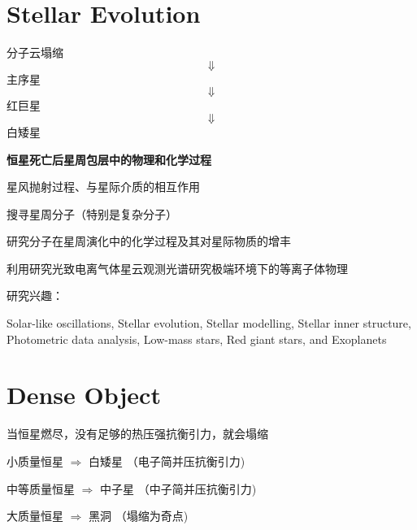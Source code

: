 \documentclass[CJK]{beamer}
\begin{document}
\section{Stellar Evolution}


\begin{frame}
  \bch
  \emini
  \bcenter
  分子云塌缩
  $$ \Downarrow$$
  主序星
  $$ \Downarrow$$
  红巨星
  $$ \Downarrow$$
  白矮星
  \ecenter
  \emini
  \ech
\end{frame}

\begin{frame}
  \bch

        {\bf 恒星死亡后星周包层中的物理和化学过程}
        
  
  \emini
                 
        \bitem
        \item{星风抛射过程、与星际介质的相互作用}
        \item{搜寻星周分子（特别是复杂分子）}
        \item{研究分子在星周演化中的化学过程及其对星际物质的增丰}
        \item{利用研究光致电离气体星云观测光谱研究极端环境下的等离子体物理}
        \eitem
  
  \emini
  \ech
\end{frame}

\begin{frame}
  \bch
  \emini
  研究兴趣：
  
  Solar-like oscillations, Stellar evolution, Stellar modelling, Stellar inner structure, Photometric data analysis, Low-mass stars, Red giant stars, and Exoplanets
  \emini
  \ech
\end{frame}

\section{Dense Object}


\begin{frame}
  \bch
  
  当恒星燃尽，没有足够的热压强抗衡引力，就会塌缩
  
  \bitem
\item{小质量恒星 $\Rightarrow$  白矮星 （电子简并压抗衡引力)

  }
\item{中等质量恒星 $\Rightarrow$ 中子星 （中子简并压抗衡引力)

  }
\item{大质量恒星 $\Rightarrow$ 黑洞 （塌缩为奇点)
    }
  \eitem
  
  \ech
\end{frame}
\end{document}
